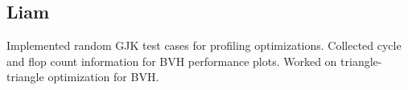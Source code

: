 \documentclass[twocolumn]{article}
\begin{document}
\subsection{Liam} Implemented random GJK test cases for profiling optimizations. Collected cycle and flop count information for BVH performance plots. Worked on triangle-triangle optimization for BVH.



\end{document}
